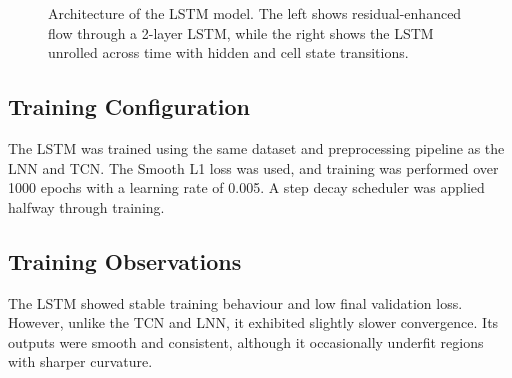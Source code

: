 \begin{figure}[H]
    \caption{Architecture of the LSTM model. The left shows residual-enhanced flow through a 2-layer LSTM, while the right shows the LSTM unrolled across time with hidden and cell state transitions.}
    \label{fig:lstm_architecture_final}
\end{figure}

\subsection*{Training Configuration}
The LSTM was trained using the same dataset and preprocessing pipeline as the LNN and TCN. The Smooth L1 loss was used, and training was performed over 1000 epochs with a learning rate of 0.005. A step decay scheduler was applied halfway through training.

\subsection*{Training Observations}
The LSTM showed stable training behaviour and low final validation loss. However, unlike the TCN and LNN, it exhibited slightly slower convergence. Its outputs were smooth and consistent, although it occasionally underfit regions with sharper curvature.

